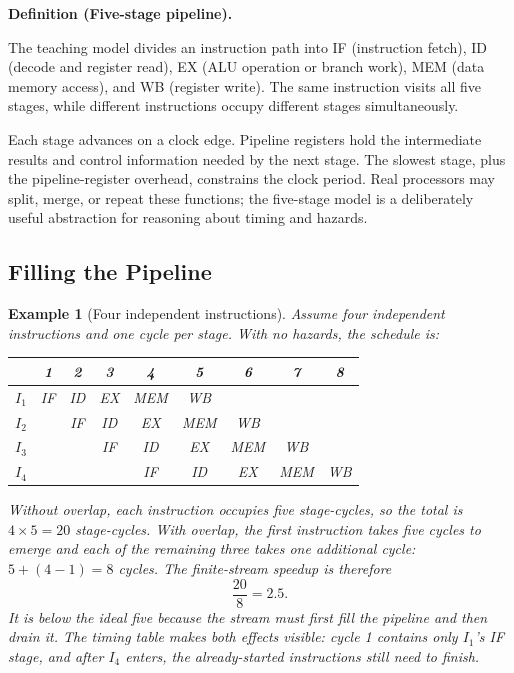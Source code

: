 \documentclass[11pt]{article}
\newtheorem{example}{Example}[section]
\newenvironment{definitionbox}[1]{%
  \par\noindent\textbf{Definition (#1).}\ \itshape
}{\par\vspace{0.3em}}
\begin{document}
\begin{definitionbox}{Five-stage pipeline}
The teaching model divides an instruction path into IF (instruction fetch),
ID (decode and register read), EX (ALU operation or branch work), MEM (data
memory access), and WB (register write). The same instruction visits all five
stages, while different instructions occupy different stages simultaneously.
\end{definitionbox}

Each stage advances on a clock edge. Pipeline registers hold the intermediate
results and control information needed by the next stage. The slowest stage,
plus the pipeline-register overhead, constrains the clock period. Real
processors may split, merge, or repeat these functions; the five-stage model
is a deliberately useful abstraction for reasoning about timing and hazards.

\subsection{Filling the Pipeline}

\begin{example}[Four independent instructions]
\label{ex:fill}
Assume four independent instructions and one cycle per stage. With no hazards,
the schedule is:
\begin{center}
\begin{tabular}{@{}c|cccccccc@{}}
\toprule
 & 1 & 2 & 3 & 4 & 5 & 6 & 7 & 8 \\
\midrule
$I_1$ & IF & ID & EX & MEM & WB & & & \\
$I_2$ & & IF & ID & EX & MEM & WB & & \\
$I_3$ & & & IF & ID & EX & MEM & WB & \\
$I_4$ & & & & IF & ID & EX & MEM & WB \\
\bottomrule
\end{tabular}
\end{center}

Without overlap, each instruction occupies five stage-cycles, so the total is
$4\times5=20$ stage-cycles. With overlap, the first instruction takes five
cycles to emerge and each of the remaining three takes one additional cycle:
$5+(4-1)=8$ cycles. The finite-stream speedup is therefore
\[
  \frac{20}{8}=2.5.
\]
It is below the ideal five because the stream must first fill the pipeline and
then drain it. The timing table makes both effects visible: cycle 1 contains
only $I_1$'s IF stage, and after $I_4$ enters, the already-started
instructions still need to finish.
\end{example}
\end{document}
